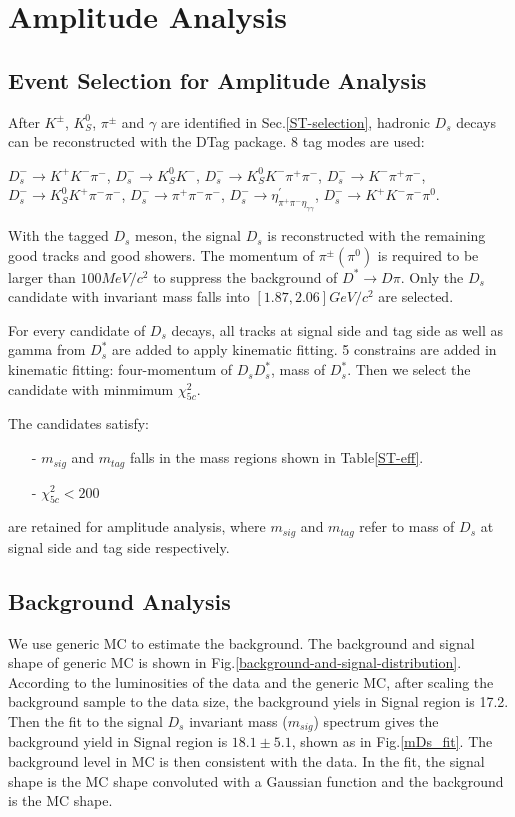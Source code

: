 \section{Amplitude Analysis}

\subsection{Event Selection for Amplitude Analysis}
\label{AASelection}
\par{
After $K^{\pm}$, $K_S^{0}$, $\pi^{\pm}$ and $\gamma$ are identified in Sec.\ref{ST-selection}, hadronic $D_{s}$ decays can be reconstructed with the DTag package. 8 tag modes are used:

$D_{s}^{-} \rightarrow K^{+}K^{-}\pi^{-}$, $D_{s}^{-} \rightarrow K_{S}^{0}K^{-}$, $D_{s}^{-} \rightarrow K_{S}^{0}K^{-}\pi^{+}\pi^{-}$, $D_{s}^{-} \rightarrow K^{-}\pi^{+}\pi^{-}$, $D_{s}^{-} \rightarrow K_{S}^{0}K^{+}\pi^{-}\pi^{-}$, $D_{s}^{-} \rightarrow \pi^{+}\pi^{-}\pi^{-}$, $D_{s}^{-} \rightarrow \eta^{'}_{\pi^{+}\pi^{-}\eta_{\gamma\gamma}}$, $D_{s}^{-} \rightarrow K^{+}K^{-}\pi^{-}\pi^{0}$.


With the tagged $D_{s}$ meson, the signal $D_{s}$ is reconstructed with the remaining good tracks and good showers. 
The momentum of $\pi^{\pm}(\pi^{0})$ is required to be larger than $100 MeV/c^{2}$ to suppress the background of $D^{*} \rightarrow D\pi$.
Only the $D_{s}$ candidate with invariant mass falls into $[1.87, 2.06]GeV/c^{2}$ are selected.

For every candidate of $D_{s}$ decays, all tracks at signal side and tag side as well as gamma from $D_{s}^{*}$ are added to apply kinematic fitting. 5 constrains are added in kinematic fitting: four-momentum of $D_{s}D_{s}^{*}$, mass of $D_{s}^{*}$. Then we select the candidate with minmimum $\chi_{5c}^{2}$.  

The candidates satisfy:
\begin{itemize}
    \item[-] $m_{sig}$ and $m_{tag}$ falls in the mass regions shown in Table\ref{ST-eff}. 
	\item[-] $\chi_{5c}^{2} < 200 $
\end{itemize}
are retained for amplitude analysis, where $m_{sig}$ and $m_{tag}$ refer to mass of $D_{s}$ at signal side and tag side respectively.
}

\subsection{Background Analysis}
We use generic MC to estimate the background. The background and signal shape of generic MC is shown in Fig.\ref{background-and-signal-distribution}. 
According to the luminosities of the data and the generic MC, after scaling the background sample to the data size, the background yiels in Signal region is 17.2. 
Then the fit to the signal $D_{s}$ invariant mass ($m_{sig}$) spectrum gives the background yield in Signal region is $18.1 \pm 5.1$, shown as in Fig.\ref{mDs_fit}.  
The background level in MC is then consistent with the data. In the fit, the signal shape is the MC shape convoluted with a Gaussian function and the background is the MC shape. 

